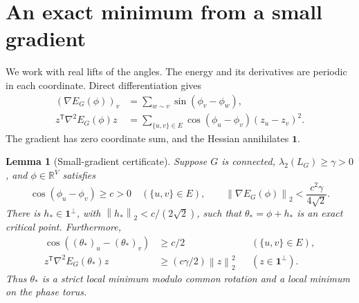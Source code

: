 \documentclass[11pt]{article}
\newtheorem{lemma}[theorem]{Lemma}
\theoremstyle{definition}
\theoremstyle{remark}
\newcommand{\R}{\mathbb R}
\newcommand{\one}{\mathbf 1}
\newcommand{\norm}[1]{\left\lVert#1\right\rVert}
\begin{document}
\section{An exact minimum from a small gradient}

We work with real lifts of the angles. The energy and its derivatives are
periodic in each coordinate. Direct differentiation gives
\begin{align}
 (\nabla E_G(\phi))_v
   &=\sum_{w\sim v}\sin(\phi_v-\phi_w),\label{eq:gradient}\\
 z^{\mathsf T}\nabla^2E_G(\phi)z
   &=\sum_{\{u,v\}\in E}\cos(\phi_u-\phi_v)(z_u-z_v)^2.
   \label{eq:hessian}
\end{align}
The gradient has zero coordinate sum, and the Hessian annihilates $\one$.

\begin{lemma}[Small-gradient certificate]\label{lem:certificate}
Suppose $G$ is connected, $\lambda_2(L_G)\ge\gamma>0$, and
$\phi\in\R^V$ satisfies
\begin{equation}\label{eq:certificate-hyp}
 \cos(\phi_u-\phi_v)\ge c>0\quad(\{u,v\}\in E),
 \qquad
 \norm{\nabla E_G(\phi)}_2<\frac{c^2\gamma}{4\sqrt2}.
\end{equation}
There is $h_*\in\one^\perp$, with $\norm{h_*}_2<c/(2\sqrt2)$, such that
$\theta_* =\phi+h_*$ is an exact critical point. Furthermore,
\begin{align}
 \cos((\theta_*)_u-(\theta_*)_v)&\ge c/2
       &&(\{u,v\}\in E),\label{eq:positive-cos}\\
 z^{\mathsf T}\nabla^2E_G(\theta_*)z
       &\ge(c\gamma/2)\norm z_2^2
       &&(z\in\one^\perp).\label{eq:positive-hessian}
\end{align}
Thus $\theta_*$ is a strict local minimum modulo common rotation and a local
minimum on the phase torus.
\end{lemma}
\end{document}
